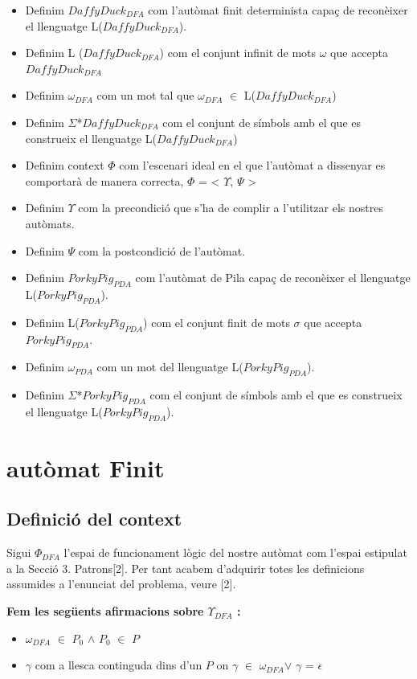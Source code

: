 \documentclass[12pt,a4paper]{report}
\def \w{$\omega$}
\def \dfa{$DaffyDuck_{DFA} $}
\def \alphabetDFA{$\Sigma$*\dfa}
\def \alphabetPDA{$\Sigma$*\pda}
\def \wdfa{$\omega_{DFA} $}
\def \wpda{$\omega_{PDA} $}
\def \pda{$PorkyPig_{PDA} $}
\def \context{$\Phi$}
\def \contextDFA{$\Phi_{DFA}$}
\def \pre{$\Upsilon$}
\def \preDFA{$\Upsilon_{DFA}$}
\def \post{$\Psi$}
\def \llesca{$\gamma$}
\begin{document}
\begin{itemize}
\item Definim \dfa{} com l’autòmat finit determinista capaç de reconèixer el llenguatge L(\dfa{}).
\item Definim L (\dfa{}) com el conjunt infinit de mots \w{} que accepta \dfa{}
\item Definim \wdfa{} com un mot tal que \wdfa{} $\in$ L(\dfa{})
\item Definim \alphabetDFA{} com el conjunt de símbols amb el que es construeix el llenguatge L(\dfa{})
\item Definim context \context{} com l’escenari ideal en el que l’autòmat a dissenyar es comportarà de manera correcta, \context{} = < \pre{}, \post{} >
\item Definim \pre{} com la precondició que s'ha de complir a l'utilitzar els nostres autòmats.
\item Definim \post{} com la postcondició de l'autòmat.
\item Definim \pda{} com l'autòmat de Pila capaç de reconèixer el llenguatge L(\pda{}).
\item Definim L(\pda{}) com el conjunt finit de mots $\sigma$ que accepta \pda{}.
\item Definim \wpda{} com un mot del llenguatge L(\pda{}).
\item Definim \alphabetPDA{} com el conjunt de símbols amb el que es construeix el llenguatge L(\pda).

\end{itemize}

\chapter{autòmat Finit}

\section{Definició del context}

Sigui \contextDFA{} l'espai de funcionament lògic del nostre autòmat com l'espai estipulat a la Secció 3. Patrons[2]. Per tant acabem d'adquirir totes les definicions assumides a l'enunciat del problema, veure [2].

\textbf{Fem les següents afirmacions sobre \preDFA{} :}
\begin{itemize}
\item \wdfa{} $\in$ $P_0$ $\wedge$ $P_0$ $\in$ $P$
\item \llesca{} com a llesca continguda dins d'un $P$ on \llesca{} $\in$ \wdfa $\vee$ \llesca{} = $\epsilon$
\end{itemize}
\end{document}
